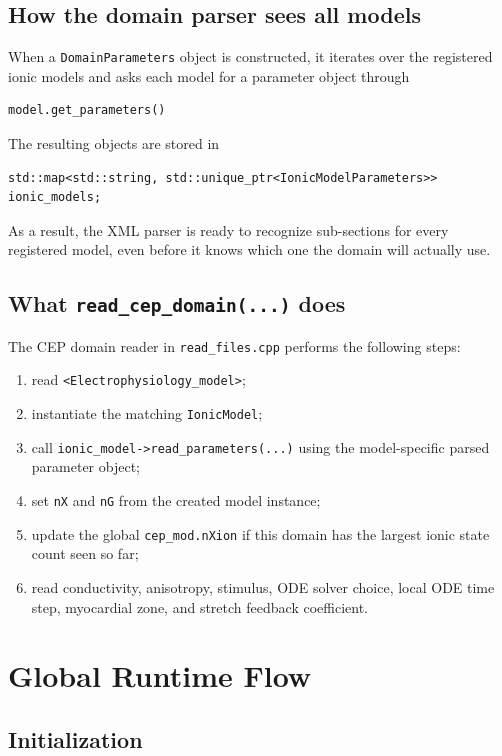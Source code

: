 \documentclass[11pt]{article}
\begin{document}
\subsection{How the domain parser sees all models}

When a \texttt{DomainParameters} object is constructed, it iterates over the registered ionic models and asks each model for a parameter object through
\begin{verbatim}
model.get_parameters()
\end{verbatim}
The resulting objects are stored in
\begin{verbatim}
std::map<std::string, std::unique_ptr<IonicModelParameters>> ionic_models;
\end{verbatim}

As a result, the XML parser is ready to recognize sub-sections for every registered model, even before it knows which one the domain will actually use.

\subsection{What \texttt{read\_cep\_domain(...)} does}

The CEP domain reader in \texttt{read\_files.cpp} performs the following steps:
\begin{enumerate}[leftmargin=*]
\item read \texttt{<Electrophysiology\_model>};
\item instantiate the matching \texttt{IonicModel};
\item call \texttt{ionic\_model->read\_parameters(...)} using the model-specific parsed parameter object;
\item set \texttt{nX} and \texttt{nG} from the created model instance;
\item update the global \texttt{cep\_mod.nXion} if this domain has the largest ionic state count seen so far;
\item read conductivity, anisotropy, stimulus, ODE solver choice, local ODE time step, myocardial zone, and stretch feedback coefficient.
\end{enumerate}

\section{Global Runtime Flow}

\subsection{Initialization}
\end{document}
